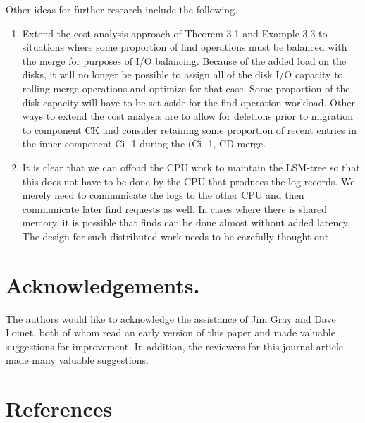 \documentclass[a4paper,11pt,notitlepage,twoside,openright]{article}
\begin{document}
Other ideas for further research include the following.


\begin{enumerate}
\def\labelenumi{(\arabic{enumi})}
\item
  Extend the cost analysis approach of Theorem 3.1 and Example 3.3 to
  situations where some proportion of find operations must be balanced
  with the merge for purposes of I/O balancing. Because of the added
  load on the disks, it will no longer be possible to assign all of the
  disk I/O capacity to rolling merge operations and optimize for that
  case. Some proportion of the disk capacity will have to be set aside
  for the find operation workload. Other ways to extend the cost
  analysis are to allow for deletions prior to migration to component CK
  and consider retaining some proportion of recent entries in the inner
  component Ci- 1 during the (Ci- 1, CD merge.
\item
  It is clear that we can offoad the CPU work to maintain the LSM-tree
  so that this does not have to be done by the CPU that produces the log
  records. We merely need to communicate the logs to the other CPU and
  then communicate later find requests as well. In cases where there is
  shared memory, it is possible that finds can be done almost without
  added latency. The design for such distributed work needs to be
  carefully thought out.
\end{enumerate}

\hypertarget{acknowledgements.}{%
\section{Acknowledgements.}\label{acknowledgements.}}


The authors would like to acknowledge the assistance of Jim Gray and
Dave Lomet, both of whom read an early version of this paper and made
valuable suggestions for improvement. In addition, the reviewers for
this journal article made many valuable suggestions.


\hypertarget{references}{%
\section{References}\label{references}}
\end{document}
